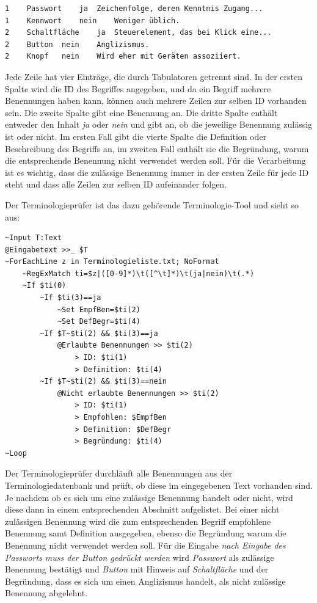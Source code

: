 \begin{verbatim}
1    Passwort    ja  Zeichenfolge, deren Kenntnis Zugang...
1    Kennwort    nein    Weniger üblich.
2    Schaltfläche    ja  Steuerelement, das bei Klick eine...
2    Button  nein    Anglizismus.
2    Knopf   nein    Wird eher mit Geräten assoziiert.
\end{verbatim}

Jede Zeile hat vier Einträge, die durch Tabulatoren getrennt sind. In der ersten Spalte wird die ID des Begriffes angegeben, und da ein Begriff mehrere Benennungen haben kann, können auch mehrere Zeilen zur selben ID vorhanden sein. Die zweite Spalte gibt eine Benennung an. Die dritte Spalte enthält entweder den Inhalt \emph{ja} oder \emph{nein} und gibt an, ob die jeweilige Benennung zulässig ist oder nicht. Im ersten Fall gibt die vierte Spalte die Definition oder Beschreibung des Begriffs an, im zweiten Fall enthält sie die Begründung, warum die entsprechende Benennung nicht verwendet werden soll. Für die Verarbeitung ist es wichtig, dass die zulässige Benennung immer in der ersten Zeile für jede ID steht und dass alle Zeilen zur selben ID aufeinander folgen.

Der Terminologieprüfer ist das dazu gehörende Terminologie-Tool und sieht so aus:

\label{BspTerminologiepruefer}
\begin{verbatim}
~Input T:Text
@Eingabetext >>_ $T
~ForEachLine z in Terminologieliste.txt; NoFormat
    ~RegExMatch ti=$z|([0-9]*)\t([^\t]*)\t(ja|nein)\t(.*)
    ~If $ti(0)
        ~If $ti(3)==ja
            ~Set EmpfBen=$ti(2)
            ~Set DefBegr=$ti(4)
        ~If $T~$ti(2) && $ti(3)==ja
            @Erlaubte Benennungen >> $ti(2)
                > ID: $ti(1)
                > Definition: $ti(4)
        ~If $T~$ti(2) && $ti(3)==nein
            @Nicht erlaubte Benennungen >> $ti(2)
                > ID: $ti(1)
                > Empfohlen: $EmpfBen
                > Definition: $DefBegr
                > Begründung: $ti(4)
~Loop
\end{verbatim}

Der Terminologieprüfer durchläuft alle Benennungen aus der Terminologiedatenbank und prüft, ob diese im eingegebenen Text vorhanden sind. Je nachdem ob es sich um eine zulässige Benennung handelt oder nicht, wird diese dann in einem entsprechenden Abschnitt aufgelistet. Bei einer nicht zulässigen Benennung wird die zum entsprechenden Begriff empfohlene Benennung samt Definition ausgegeben, ebenso die Begründung warum die Benennung nicht verwendet werden soll. Für die Eingabe \emph{nach Eingabe des Passworts muss der Button gedrückt werden} wird \emph{Passwort} als zulässige Benennung bestätigt und \emph{Button} mit Hinweis auf \emph{Schaltfläche} und der Begründung, dass es sich um einen Anglizismus handelt, als nicht zulässige Benennung abgelehnt. 

